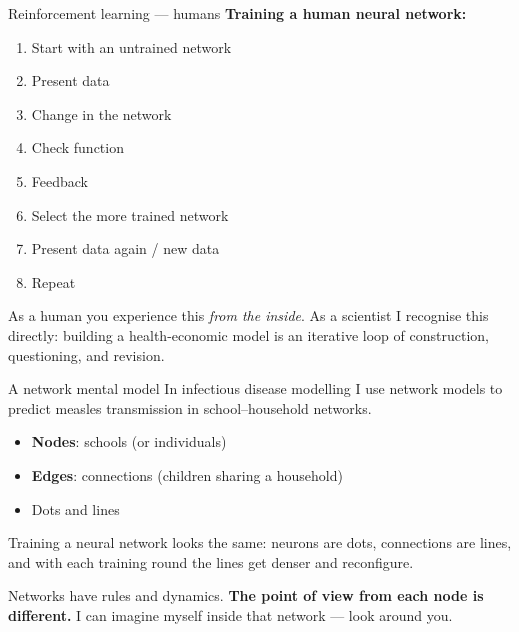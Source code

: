 \documentclass[aspectratio=169]{beamer}
\begin{document}
\begin{frame}{Reinforcement learning --- humans}
  \textbf{Training a human neural network:}
  \begin{enumerate}
    \item Start with an untrained network
    \item Present data
    \item Change in the network
    \item Check function
    \item Feedback
    \item Select the more trained network
    \item Present data again / new data
    \item Repeat
  \end{enumerate}
  \vspace{0.5em}
  As a human you experience this \emph{from the inside}. As a scientist I
  recognise this directly: building a health-economic model is an iterative loop
  of construction, questioning, and revision.
\end{frame}

\begin{frame}{A network mental model}
  In infectious disease modelling I use network models to predict measles
  transmission in school--household networks.

  \begin{itemize}
    \item \textbf{Nodes}: schools (or individuals)
    \item \textbf{Edges}: connections (children sharing a household)
    \item Dots and lines
  \end{itemize}

  \vspace{0.5em}
  Training a neural network looks the same: neurons are dots, connections are
  lines, and with each training round the lines get denser and reconfigure.

  \vspace{0.5em}
  Networks have rules and dynamics. \textbf{The point of view from each node is
  different.} I can imagine myself inside that network --- look around you.
\end{frame}
\end{document}
